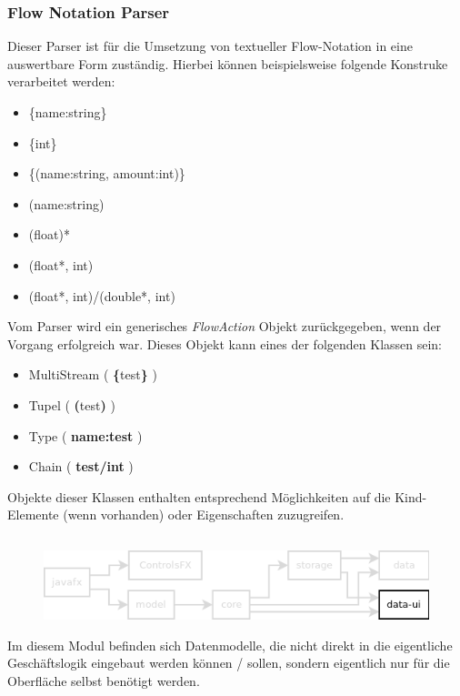 \subsubsection{Flow Notation Parser}
Dieser Parser ist für die Umsetzung von textueller Flow-Notation in eine auswertbare Form zuständig. Hierbei können
beispielsweise folgende Konstruke verarbeitet werden:

\begin{itemize}
	\item \{name:string\}
	\item \{int\}
	\item \{(name:string, amount:int)\}
	\item (name:string)
	\item (float)*
	\item (float*, int)
	\item (float*, int)/(double*, int)
\end{itemize}

\pagebreak
Vom Parser wird ein generisches \textit{FlowAction} Objekt zurückgegeben, wenn der Vorgang erfolgreich war. Dieses
Objekt kann eines der folgenden Klassen sein:

\begin{itemize}
	\item MultiStream ( \textbf{\{}test\textbf{\}} )
	\item Tupel ( \textbf{(}test\textbf{)} )
	\item Type ( \textbf{name:test} )
	\item Chain ( \textbf{test/int} )
\end{itemize}
Objekte dieser Klassen enthalten entsprechend Möglichkeiten auf die Kind-Elemente (wenn vorhanden) oder
Eigenschaften zuzugreifen.
\subsection{\textModDataUI}
\label{\textModDataUI}
\begin{figure}[H]
	\centering
	\includegraphics[width=.8\textwidth]{module_dependencies_data-ui.png}
\end{figure}

Im diesem Modul befinden sich Datenmodelle, die nicht direkt in die eigentliche Geschäftslogik
eingebaut werden können / sollen, sondern eigentlich nur für die Oberfläche selbst benötigt werden.

